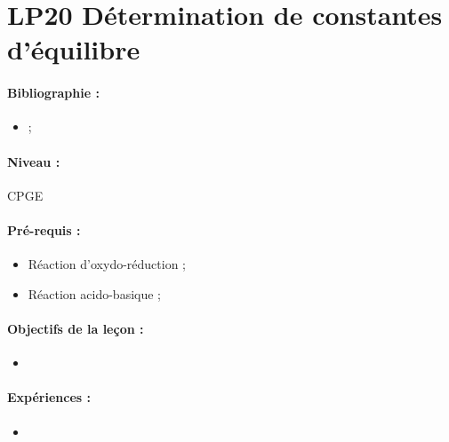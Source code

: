 \section{LP20 Détermination de constantes d'équilibre}

\paragraph{Bibliographie :}
\begin{itemize}
\item ;
\end{itemize}

\paragraph{Niveau :} CPGE

\paragraph{Pré-requis :}
\begin{itemize}
\item Réaction d'oxydo-réduction ;
\item Réaction acido-basique ;
\end{itemize}

\paragraph{Objectifs de la leçon :}
\begin{itemize}
\item
\end{itemize}

\paragraph{Expériences :}
\begin{itemize}
\item
\end{itemize}